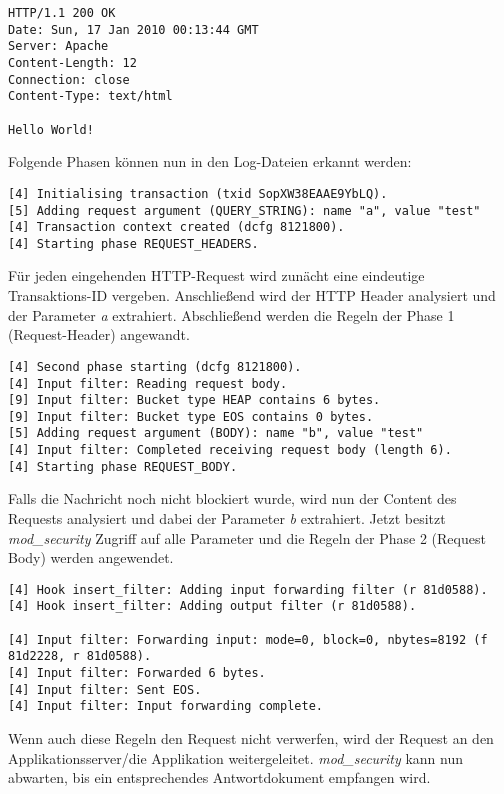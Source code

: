 \begin{verbatim}
HTTP/1.1 200 OK
Date: Sun, 17 Jan 2010 00:13:44 GMT
Server: Apache
Content-Length: 12
Connection: close
Content-Type: text/html

Hello World!
\end{verbatim}

Folgende Phasen können nun in den Log-Dateien erkannt werden:

\begin{verbatim}
[4] Initialising transaction (txid SopXW38EAAE9YbLQ).
[5] Adding request argument (QUERY_STRING): name "a", value "test"
[4] Transaction context created (dcfg 8121800).
[4] Starting phase REQUEST_HEADERS.
\end{verbatim}

Für jeden eingehenden HTTP-Request wird zunächt eine eindeutige Transaktions-ID vergeben. Anschließend wird der HTTP Header analysiert und der Parameter \textit{a} extrahiert. Abschließend werden die Regeln der Phase 1 (Request-Header) angewandt.

\begin{verbatim}
[4] Second phase starting (dcfg 8121800).
[4] Input filter: Reading request body.
[9] Input filter: Bucket type HEAP contains 6 bytes.
[9] Input filter: Bucket type EOS contains 0 bytes.
[5] Adding request argument (BODY): name "b", value "test"
[4] Input filter: Completed receiving request body (length 6).
[4] Starting phase REQUEST_BODY.
\end{verbatim}

Falls die Nachricht noch nicht blockiert wurde, wird nun der Content des Requests analysiert und dabei der Parameter \textit{b} extrahiert. Jetzt besitzt \textit{mod\_security} Zugriff auf alle Parameter und die Regeln der Phase 2 (Request Body) werden angewendet.

\begin{verbatim}
[4] Hook insert_filter: Adding input forwarding filter (r 81d0588).
[4] Hook insert_filter: Adding output filter (r 81d0588).

[4] Input filter: Forwarding input: mode=0, block=0, nbytes=8192 (f 81d2228, r 81d0588).
[4] Input filter: Forwarded 6 bytes.
[4] Input filter: Sent EOS.
[4] Input filter: Input forwarding complete.
\end{verbatim}

Wenn auch diese Regeln den Request nicht verwerfen, wird der Request an den Applikationsserver/die Applikation weitergeleitet. \textit{mod\_security} kann nun abwarten, bis ein entsprechendes Antwortdokument empfangen wird.

